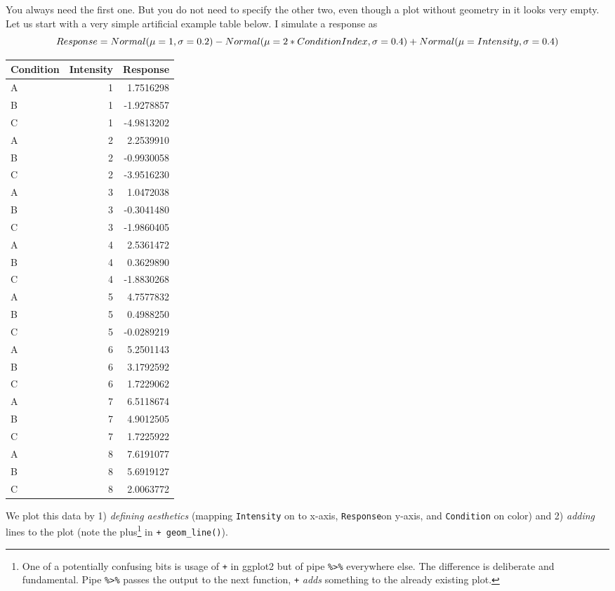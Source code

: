 \documentclass[
]{book}
\begin{document}
You always need the first one. But you do not need to specify the other two, even though a plot without geometry in it looks very empty. Let us start with a very simple artificial example table below. I simulate a response as
\[Response = Normal(\mu=1, \sigma=0.2) - \\Normal(\mu=2*ConditionIndex, \sigma=0.4) + \\Normal(\mu=Intensity, \sigma=0.4)\]

\begin{tabular}{l|r|r}
\hline
Condition & Intensity & Response\\
\hline
A & 1 & 1.7516298\\
\hline
B & 1 & -1.9278857\\
\hline
C & 1 & -4.9813202\\
\hline
A & 2 & 2.2539910\\
\hline
B & 2 & -0.9930058\\
\hline
C & 2 & -3.9516230\\
\hline
A & 3 & 1.0472038\\
\hline
B & 3 & -0.3041480\\
\hline
C & 3 & -1.9860405\\
\hline
A & 4 & 2.5361472\\
\hline
B & 4 & 0.3629890\\
\hline
C & 4 & -1.8830268\\
\hline
A & 5 & 4.7577832\\
\hline
B & 5 & 0.4988250\\
\hline
C & 5 & -0.0289219\\
\hline
A & 6 & 5.2501143\\
\hline
B & 6 & 3.1792592\\
\hline
C & 6 & 1.7229062\\
\hline
A & 7 & 6.5118674\\
\hline
B & 7 & 4.9012505\\
\hline
C & 7 & 1.7225922\\
\hline
A & 8 & 7.6191077\\
\hline
B & 8 & 5.6919127\\
\hline
C & 8 & 2.0063772\\
\hline
\end{tabular}

We plot this data by 1) \emph{defining aesthetics} (mapping \texttt{Intensity} on to x-axis, \texttt{Response}on y-axis, and \texttt{Condition} on color) and 2) \emph{adding} lines to the plot (note the plus\footnote{One of a potentially confusing bits is usage of \texttt{+} in ggplot2 but of pipe \texttt{\%\textgreater{}\%} everywhere else. The difference is deliberate and fundamental. Pipe \texttt{\%\textgreater{}\%} passes the output to the next function, \texttt{+} \emph{adds} something to the already existing plot.} in \texttt{+\ geom\_line()}).
\end{document}
